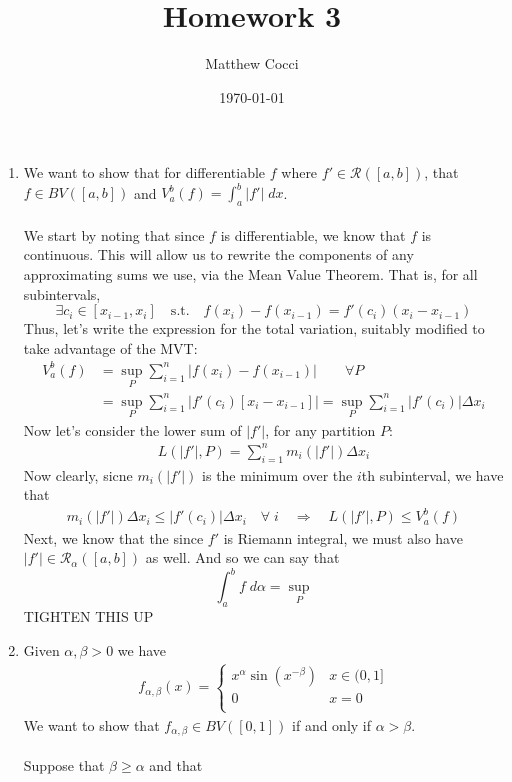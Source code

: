 \documentclass[12pt]{article}
\author{Matthew Cocci}
\title{\textbf{Homework 3}}
\date{\today}
\theoremstyle{plain}
\theoremstyle{definition}
\theoremstyle{remark}
\begin{document}
\maketitle 

\begin{enumerate}
    
\item We want to show that for differentiable $f$ where $f'\in\mathscr{R}([a,b])$, that $f\in BV([a,b])$ and $V^b_a(f) = \int^b_a |f'| \; dx$. 
\\
\\
We start by noting that since $f$ is differentiable, we know that $f$ is continuous. This will allow us to rewrite the components of any approximating sums we use, via the Mean Value Theorem. That is, for all subintervals, 
\[ 
    \exists c_i \in [x_{i-1}, x_i] \quad \text{s.t.} \quad
    f(x_i) - f(x_{i-1}) = f'(c_i) (x_{i} - x_{i-1})
\]
Thus, let's write the expression for the total variation, suitably modified to take advantage of the MVT:
\begin{align*}
    V^b_a(f) &= \sup_P \sum_{i=1}^n |f(x_i) - f(x_{i-1})| \qquad \forall P \\
    &= \sup_P \sum_{i=1}^n |f'(c_i)[x_i-x_{i-1}]| =\sup_P
    \sum_{i=1}^n |f'(c_i)| \Delta x_i
\end{align*}
Now let's consider the lower sum of $|f'|$, for any partition $P$:
\begin{align*}
    L(|f'|,P) = \sum_{i=1}^n m_i(|f'|) \Delta x_i 
\end{align*}
Now clearly, sicne $m_i(|f'|)$ is the minimum over the $i$th subinterval, we have that 
\begin{align*}
    m_i(|f'|) \Delta x_i  \leq |f'(c_i)| \Delta x_i \quad \forall \; i
    \quad \Rightarrow \quad L(|f'|,P) \leq V^b_a(f)
\end{align*}
Next, we know that the since $f'$ is Riemann integral, we must also have $|f'| \in \mathscr{R}_\alpha([a,b])$ as well. And so we can say that
    \[ \int^b_a f\;d\alpha = \sup_P \]
TIGHTEN THIS UP


\item Given $\alpha, \beta >0$ we have
\begin{align*}
    f_{\alpha, \beta}(x) = 
        \begin{cases}
            x^\alpha \sin(x^{-\beta}) & x\in (0, 1] \\
            0 & x=0 \\
        \end{cases}
\end{align*}
We want to show that $f_{\alpha,\beta}\in BV([0,1])$ if and only if $\alpha>\beta$.
\\
\\
Suppose that $\beta\geq\alpha$ and that 


\end{enumerate}
\end{document}
